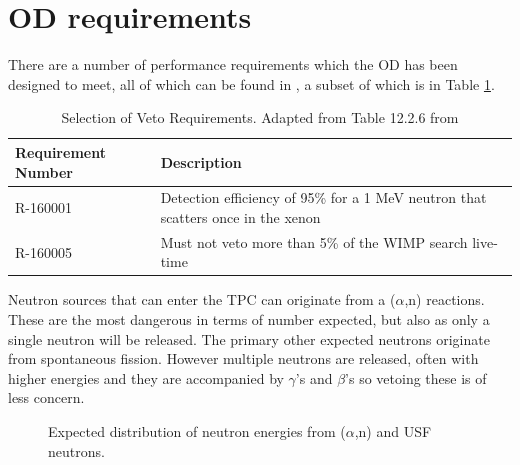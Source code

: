 \section{OD requirements}

\par
There are a number of performance requirements which the OD has been designed to meet, all of which can be found in \cite{LZ_TechnicalDesignReview_ref}, 
a subset of which is in Table \ref{tab:veto_requirements}.

\begin{table}[!htbp]
    \centering
    \begin{tabular}{p{}p{}} %
    \hline
    {Requirement Number} & {Description} \\ \hline
    R-160001             & Detection efficiency of 95\% for a 1 MeV neutron that scatters once in the xenon \\
    R-160005             & Must not veto more than 5\% of the WIMP search live-time
    \end{tabular}
    \caption{Selection of Veto Requirements. Adapted from Table 12.2.6 from \cite{LZ_TechnicalDesignReview_ref}}
    \label{tab:veto_requirements}
\end{table} 

\par
Neutron sources that can enter the TPC can originate from a ($\alpha$,n) reactions.
These are the most dangerous in terms of number expected, but also as only a single neutron will be released.
The primary other expected neutrons originate from spontaneous fission.
However multiple neutrons are released, often with higher energies and they are accompanied by $\gamma$'s and $\beta$'s so vetoing these is of less concern.

\begin{figure}[!htbp]
    \centering
    \caption{Expected distribution of neutron energies from ($\alpha$,n) and USF neutrons.}
    \label{fig:simulation_background_neutron_energies}
\end{figure}


